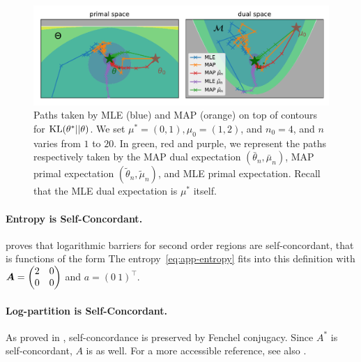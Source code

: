 \documentclass[twoside]{article}
\newcommand{\cond}{\,\vert\,}
\newcommand{\logpart}{A}
\newcommand{\conj}{{\logpart^*}}
\newcommand{\nat}{\theta}
\newcommand{\lin}[1]{\left\langle#1\right\rangle}
\begin{document}
\begin{figure}[ht]
	\centering
	\includegraphics[width=.9\textwidth]{figs/2d/gaussian_paths.pdf}
	\caption{
		Paths taken by MLE (blue) and MAP (orange) on top of contours for $\KL(\nat^* || \nat)$. 
		We set $\mu^*=(0, 1), \mu_0 = (1, 2)$, and $n_0=4$, and $n$ varies from $1$ to $20$.
		In green, red and purple, we represent the paths respectively taken by the MAP dual expectation  $(\bar\nat_n, \bar \mu_n)$, MAP primal expectation $(\tilde\nat_n,\tilde\mu_n)$, and MLE primal expectation. Recall that the MLE dual expectation is $\mu^*$ itself.
	}
	\label{fig:gaussian-paths}
\end{figure}


\paragraph{Entropy is Self-Concordant.}
\citet[Example 4.1.1.4,   p.177]{nesterov2003introductory} proves that logarithmic barriers for second order regions are self-concordant, 
that is functions of the form 
\alignn{
	f(\theta) = -\log\paren{\alpha + \lin{a, \theta} - \frac{1}{2}\lin{\mA \theta, \theta}}
	\text{ on }
	\left\{\theta\in\mathbb{R}^n \cond \alpha + \lin{a, \theta} - \frac{1}{2}\lin{\mA \theta, \theta} > 0\right\}.
}
The entropy~\eqref{eq:app-entropy} fits into this definition with ${\bm{A}} = \begin{pmatrix} 2 & 0 \\ 0 & 0 \end{pmatrix}$ and $a = ( 0 \ 1 )^\top$.

\paragraph{Log-partition is Self-Concordant.}
As proved in \citet{nesterov1994interior}, self-concordance is preserved by Fenchel conjugacy.
Since $\conj$ is self-concordant, $\logpart$ is as well.
For a more accessible reference, see also \citet[Prop.~6]{sun2019generalized}.
\end{document}
